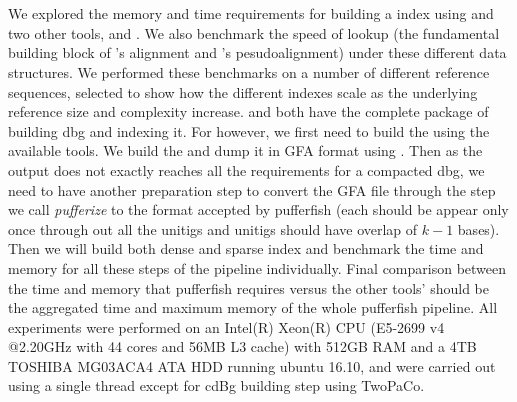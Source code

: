 \section{}\label{sec:results}

We explored the memory and time requirements for building a \ccdbg index using
\pufferfish and two other tools, \bwa and \kallisto. We also benchmark the speed of
\kmer lookup (the fundamental building block of \bwa's alignment and \kallisto's
pesudoalignment) under these different data structures. We performed these
benchmarks on a number of different reference sequences, selected to show how
the different indexes scale as the underlying reference size and complexity
increase. \bwa and \kallisto both have the complete package of building dbg and 
indexing it. For \pufferfish however, we first need to build the \ccdbg using the available
tools. We build the \ccdbg and dump it in GFA format using \twopaco. Then as the output does
not exactly reaches all the requirements for a compacted dbg, we need to have another preparation 
step to convert the GFA file through the step we call \emph{pufferize} to the format accepted by pufferfish
(each \kmer should be appear only once through out all the unitigs and unitigs should have overlap of $k-1$ bases).
Then we will build both dense and sparse index and benchmark the time and memory for all these steps of the pipeline individually.
Final comparison between the time and memory that pufferfish requires versus the other tools' should be the aggregated time and
maximum memory of the whole pufferfish pipeline.
All experiments
were performed on an Intel(R) Xeon(R) CPU (E5-2699 v4 @2.20GHz with 44 cores and
56MB L3 cache) with 512GB RAM and a 4TB TOSHIBA MG03ACA4 ATA HDD running ubuntu
16.10, and were carried out using a single thread except for cdBg building step using TwoPaCo.



